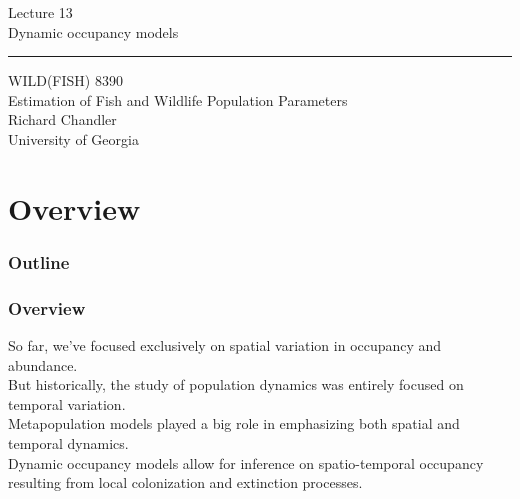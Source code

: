 \documentclass[color=usenames,dvipsnames]{beamer}\usepackage[]{graphicx}\usepackage[]{color}
\begin{document}
\begin{frame}[plain]
  \LARGE
  \centering
  {\huge Lecture 13 \\ Dynamic occupancy models} \\
  {\color{default} \rule{\textwidth}{0.1pt}}
  \vfill
  \large
  WILD(FISH) 8390 \\
  Estimation of Fish and Wildlife Population Parameters \\
  \vfill
  \large
  Richard Chandler \\
  University of Georgia \\
\end{frame}






\section{Overview}



\begin{frame}[plain]
  \frametitle{Outline}
  \Large
\end{frame}



\begin{frame}
  \frametitle{Overview}
  So far, we've focused exclusively on spatial variation in occupancy
  and abundance. \\  
  \pause
  \vfill
  But historically, the study of population dynamics was entirely
  focused on temporal variation. \\
  \pause
  \vfill
  Metapopulation models played a big role in emphasizing both spatial
  and temporal dynamics. \\
  \pause
  \vfill
  Dynamic occupancy models allow for inference on spatio-temporal
  occupancy resulting from local colonization and extinction
  processes. \\
\end{frame}
\end{document}
